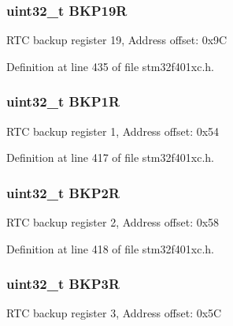 \subsubsection[{\texorpdfstring{B\+K\+P19R}{BKP19R}}]{ uint32\+\_\+t B\+K\+P19R}\hypertarget{struct_r_t_c___type_def_a4ec1dd54d976989b7c9e59fb14d974fb}{}\label{struct_r_t_c___type_def_a4ec1dd54d976989b7c9e59fb14d974fb}
R\+TC backup register 19, Address offset\+: 0x9C 

Definition at line 435 of file stm32f401xc.\+h.

\subsubsection[{\texorpdfstring{B\+K\+P1R}{BKP1R}}]{ uint32\+\_\+t B\+K\+P1R}\hypertarget{struct_r_t_c___type_def_af85290529fb82acef7c9fcea3718346c}{}\label{struct_r_t_c___type_def_af85290529fb82acef7c9fcea3718346c}
R\+TC backup register 1, Address offset\+: 0x54 

Definition at line 417 of file stm32f401xc.\+h.

\subsubsection[{\texorpdfstring{B\+K\+P2R}{BKP2R}}]{ uint32\+\_\+t B\+K\+P2R}\hypertarget{struct_r_t_c___type_def_aaa251a80daa57ad0bd7db75cb3b9cdec}{}\label{struct_r_t_c___type_def_aaa251a80daa57ad0bd7db75cb3b9cdec}
R\+TC backup register 2, Address offset\+: 0x58 

Definition at line 418 of file stm32f401xc.\+h.

\subsubsection[{\texorpdfstring{B\+K\+P3R}{BKP3R}}]{ uint32\+\_\+t B\+K\+P3R}\hypertarget{struct_r_t_c___type_def_a0b1eeda834c3cfd4d2c67f242f7b2a1c}{}\label{struct_r_t_c___type_def_a0b1eeda834c3cfd4d2c67f242f7b2a1c}
R\+TC backup register 3, Address offset\+: 0x5C 

